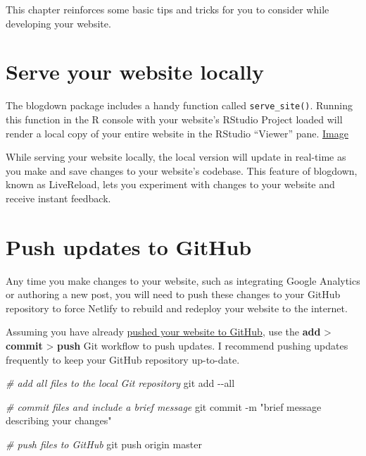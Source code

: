 \documentclass[
]{book}
\newenvironment{Shaded}{\begin{snugshade}}{\end{snugshade}}
\newcommand{\AttributeTok}[1]{\textcolor[rgb]{0.77,0.63,0.00}{#1}}
\newcommand{\CommentTok}[1]{\textcolor[rgb]{0.56,0.35,0.01}{\textit{#1}}}
\newcommand{\FunctionTok}[1]{\textcolor[rgb]{0.00,0.00,0.00}{#1}}
\newcommand{\NormalTok}[1]{#1}
\newcommand{\StringTok}[1]{\textcolor[rgb]{0.31,0.60,0.02}{#1}}
\begin{document}
This chapter reinforces some basic tips and tricks for you to consider while developing your website.

\hypertarget{serve-local}{%
\section{Serve your website locally}\label{serve-local}}

The blogdown package includes a handy function called \texttt{serve\_site()}. Running this function in the R console with your website's RStudio Project loaded will render a local copy of your entire website in the RStudio ``Viewer'' pane. \href{https://i.imgur.com/oxZgeqM.png}{Image}

While serving your website locally, the local version will update in real-time as you make and save changes to your website's codebase. This feature of blogdown, known as LiveReload, lets you experiment with changes to your website and receive instant feedback.

\hypertarget{push-updates-to-github-2}{%
\section{Push updates to GitHub}\label{push-updates-to-github-2}}

Any time you make changes to your website, such as integrating Google Analytics or authoring a new post, you will need to push these changes to your GitHub repository to force Netlify to rebuild and redeploy your website to the internet.

Assuming you have already \protect\hyperlink{initial-push}{pushed your website to GitHub}, use the \textbf{add} \textgreater{} \textbf{commit} \textgreater{} \textbf{push} Git workflow to push updates. I recommend pushing updates frequently to keep your GitHub repository up-to-date.

\begin{Shaded}
\begin{Highlighting}[]
\CommentTok{\# add all files to the local Git repository}
\FunctionTok{git}\NormalTok{ add }\AttributeTok{{-}{-}all}

\CommentTok{\# commit files and include a brief message}
\FunctionTok{git}\NormalTok{ commit }\AttributeTok{{-}m} \StringTok{"brief message describing your changes"}

\CommentTok{\# push files to GitHub}
\FunctionTok{git}\NormalTok{ push origin master}
\end{Highlighting}
\end{Shaded}
\end{document}
